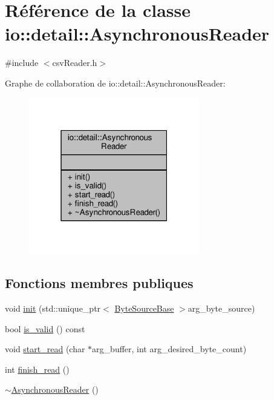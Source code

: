 \hypertarget{classio_1_1detail_1_1AsynchronousReader}{}\section{Référence de la classe io\+:\+:detail\+:\+:Asynchronous\+Reader}
\label{classio_1_1detail_1_1AsynchronousReader}


{\ttfamily \#include $<$csv\+Reader.\+h$>$}



Graphe de collaboration de io\+:\+:detail\+:\+:Asynchronous\+Reader\+:\nopagebreak
\begin{figure}[H]
\begin{center}
\leavevmode
\includegraphics[width=211pt]{classio_1_1detail_1_1AsynchronousReader__coll__graph}
\end{center}
\end{figure}
\subsection*{Fonctions membres publiques}
\begin{DoxyCompactItemize}
\item 
void \hyperlink{classio_1_1detail_1_1AsynchronousReader_a12ed45f881a671b473d95ded7ad1474c}{init} (std\+::unique\+\_\+ptr$<$ \hyperlink{classio_1_1ByteSourceBase}{Byte\+Source\+Base} $>$arg\+\_\+byte\+\_\+source)
\item 
bool \hyperlink{classio_1_1detail_1_1AsynchronousReader_ab6b6f8483008208fc3f529f94c7125e2}{is\+\_\+valid} () const
\item 
void \hyperlink{classio_1_1detail_1_1AsynchronousReader_a9818851dbb994042d0d84183220e71c6}{start\+\_\+read} (char $\ast$arg\+\_\+buffer, int arg\+\_\+desired\+\_\+byte\+\_\+count)
\item 
int \hyperlink{classio_1_1detail_1_1AsynchronousReader_a94520530423e9bfeb04c23ea4e3a8786}{finish\+\_\+read} ()
\item 
\hyperlink{classio_1_1detail_1_1AsynchronousReader_a284dd807219eb954c35de4379822c02b}{$\sim$\+Asynchronous\+Reader} ()
\end{DoxyCompactItemize}


